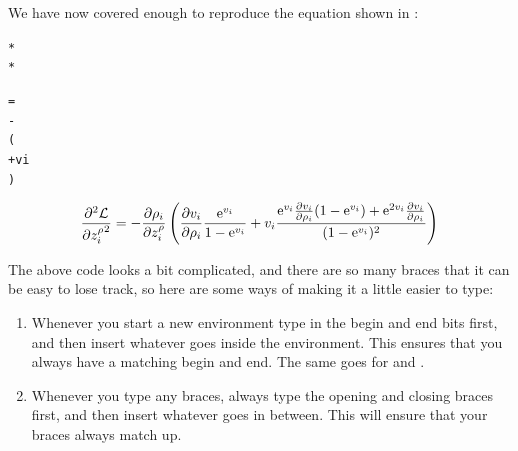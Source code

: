 \label{introeq}
We have now covered enough to reproduce the equation shown in 
:
\begin{code}
\begin{alltt}
*
*

 =
-
(
   
  + vi 
)
\end{alltt}
\end{code}%
\begin{result}
\[
\frac{\partial ^2\mathcal{L}}{\partial {z_i^\rho}^2} =
-\frac{\partial \rho_i}{\partial z_i^\rho}
\left(
  \frac{\partial v_i}{\partial \rho_i} \frac{\mathrm{e}^{v_i}}{1-\mathrm{e}^{v_i}}
  + v_i \frac{\mathrm{e}^{v_i}\frac{\partial v_i}{\partial \rho_i}(1-\mathrm{e}^{v_i})+\mathrm{e}^{2v_i}\frac{\partial v_i}{\partial \rho_i}}{(1-\mathrm{e}^{v_i})^2}
\right)
\]
\end{result}

The above code looks a bit complicated, and there are
so many braces that it can be easy to lose track, so here are some
ways of making it a little easier to type:
\begin{enumerate}
\item Whenever you start a new environment type in the
\gls{begin} and \gls{end} bits first, and then insert
whatever goes inside the environment.  This ensures that you always
have a matching \gls{begin} and \gls{end}. The same goes for 
 and .

\item Whenever you type any braces, always type the opening and
closing braces first, and then insert whatever goes in between.  This
will ensure that your braces always match up.
\end{enumerate}

